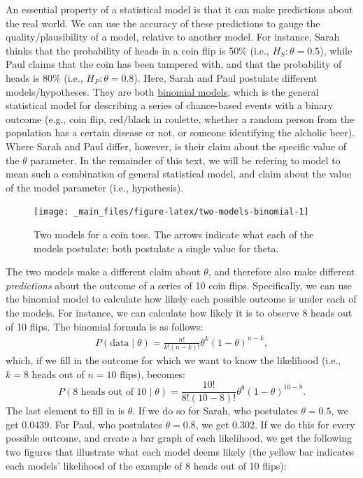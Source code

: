 \documentclass[
]{book}
\begin{document}
An essential property of a statistical model is that it can make predictions about the real world. We can use the accuracy of these predictions to gauge the quality/plausibility of a model, relative to another model. For instance,
Sarah thinks that the probability of heads in a coin flip is 50\% (i.e., \(H_S: \theta = 0.5\)), while Paul claims that the coin has been tampered with, and that the probability of heads is 80\% (i.e., \(H_P: \theta = 0.8\)). Here, Sarah and Paul postulate different models/hypotheses. They are both \href{https://en.wikipedia.org/wiki/Binomial_distribution}{binomial models}, which is the general statistical model for describing a series of chance-based events with a binary outcome (e.g., coin flip, red/black in roulette, whether a random person from the population has a certain disease or not, or someone identifying the alcholic beer). Where Sarah and Paul differ, however, is their claim about the specific value of the \(\theta\) parameter. In the remainder of this text, we will be refering to model to mean such a combination of general statistical model, and claim about the value of the model parameter (i.e., hypothesis).

\begin{figure}

{\centering \texttt{[image: \_main\_files/figure-latex/two-models-binomial-1]} 

}

\caption{Two models for a coin toss. The arrows indicate what each of the models postulate: both postulate a single value for theta.}\label{fig:two-models-binomial}
\end{figure}

The two models make a different claim about \(\theta\), and therefore also make different \emph{predictions} about the outcome of a series of 10 coin flips. Specifically, we can use the binomial model to calculate how likely each possible outcome is under each of the models. For instance, we can calculate how likely it is to observe 8 heads out of 10 flips.
The binomial formula is as follows:
\begin{align} 
\label{binomFormula}
P(\text{data} \mid \theta) = \frac{n!}{k! (n-k)!} \theta^k\left(1-\theta\right)^{n-k},
\end{align}
which, if we fill in the outcome for which we want to know the likelihood (i.e., \(k=8\) heads out of \(n=10\) flips), becomes:
\[ P(\text{8 heads out of 10} \mid \theta) = \frac{10!}{8! (10-8)!} \theta^8\left(1-\theta\right)^{10-8}.\]
The last element to fill in is \(\theta\). If we do so for Sarah, who postulates \(\theta = 0.5\), we get 0.0439. For Paul, who postulates \(\theta = 0.8\), we get 0.302. If we do this for every possible outcome, and create a bar graph of each likelihood, we get the following two figures that illustrate what each model deems likely (the yellow bar indicates each models' likelihood of the example of 8 heads out of 10 flips):
\end{document}
